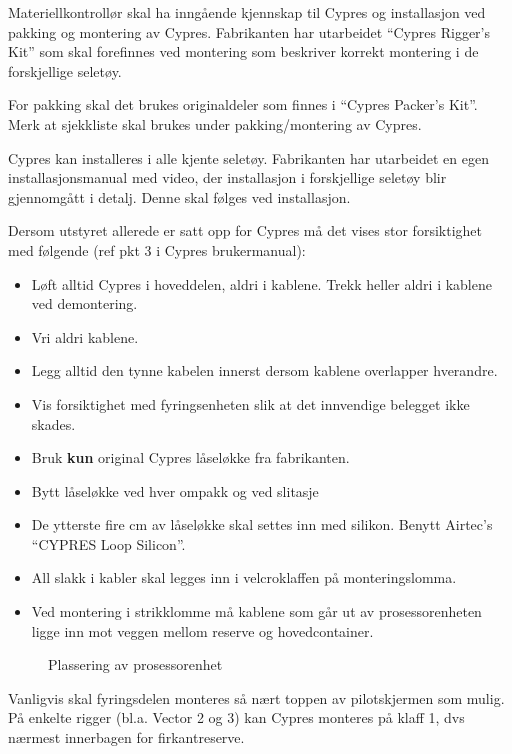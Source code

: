 Materiellkontrollør skal ha inngående kjennskap til Cypres og installasjon ved pakking og montering av Cypres. Fabrikanten har utarbeidet ``Cypres Rigger’s Kit'' som skal forefinnes ved montering som beskriver korrekt montering i de forskjellige seletøy.

For pakking skal det brukes originaldeler som finnes i ``Cypres Packer’s Kit''. Merk at sjekkliste skal brukes under pakking/montering av Cypres.

Cypres kan installeres i alle kjente seletøy. Fabrikanten har utarbeidet en egen installasjonsmanual med video, der installasjon i forskjellige seletøy blir gjennomgått i detalj. Denne skal følges ved installasjon.

Dersom utstyret allerede er satt opp for Cypres må det vises stor forsiktighet med følgende (ref pkt 3 i Cypres brukermanual):

\begin{itemize}
\item Løft alltid Cypres i hoveddelen, aldri i kablene. Trekk heller aldri i kablene ved demontering.
\item Vri aldri kablene.
\item Legg alltid den tynne kabelen innerst dersom kablene overlapper hverandre.
\item Vis forsiktighet med fyringsenheten slik at det innvendige belegget ikke skades.
\item Bruk \textbf{kun} original Cypres låseløkke fra fabrikanten.
\item Bytt låseløkke ved hver ompakk og ved slitasje
\item De ytterste fire cm av låseløkke skal settes inn med silikon. Benytt Airtec's ``CYPRES Loop Silicon''.
\item All slakk i kabler skal legges inn i velcroklaffen på monteringslomma.
\item Ved montering i strikklomme må kablene som går ut av prosessorenheten ligge inn mot veggen mellom reserve og hovedcontainer.
\end{itemize}

\begin{figure}
	\caption{Plassering av prosessorenhet}
\end{figure}

Vanligvis skal fyringsdelen monteres så nært toppen av pilotskjermen som mulig. På enkelte rigger (bl.a. Vector 2 og 3) kan Cypres monteres på klaff 1, dvs nærmest innerbagen for firkantreserve.

